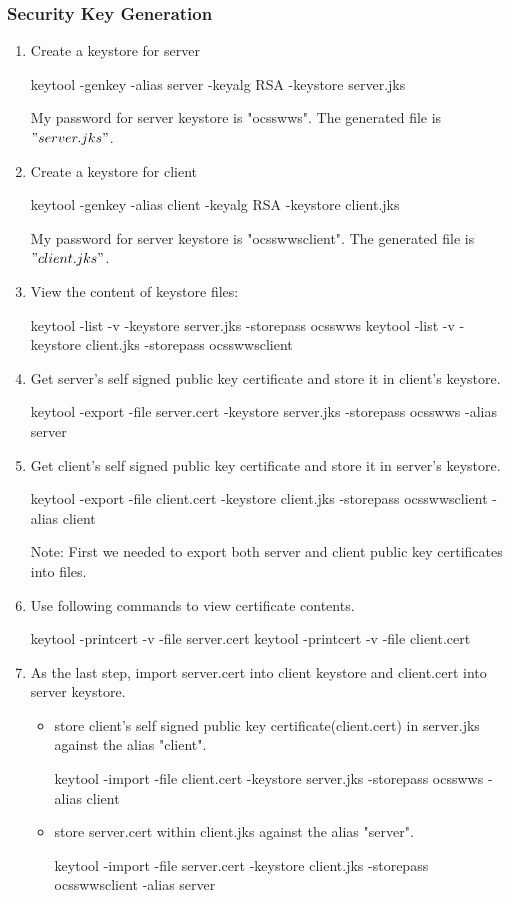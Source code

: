 \documentclass[11pt, oneside]{article}   	%
\begin{document}
\subsubsection{\color{DeepPink4}Security Key Generation}
\begin{enumerate}
\item  Create a keystore for server
\begin{code}
keytool -genkey -alias server -keyalg RSA -keystore server.jks
\end{code}
My password for server keystore is "ocsswws". The generated file is $"server.jks"$.
\item  Create a keystore for client
\begin{code}
keytool -genkey -alias client -keyalg RSA -keystore client.jks
\end{code}
My password for server keystore is "ocsswwsclient". The generated file is $"client.jks"$.

\item
View the content of keystore files:
\begin{code}
keytool -list -v -keystore server.jks -storepass ocsswws
keytool -list -v -keystore client.jks -storepass ocsswwsclient
\end{code}
\item Get server's self signed public key certificate and store it in client's keystore.
\begin{code}
keytool -export -file server.cert -keystore server.jks -storepass ocsswws -alias server
\end{code}
\item Get client's self signed public key certificate and store it in server's keystore.
\begin{code}
keytool -export -file client.cert -keystore client.jks -storepass ocsswwsclient -alias client
\end{code}

{\color{red}Note: First we needed to export both server and client public key certificates into files.}
\item Use following commands to view certificate contents.
\begin{code}
keytool -printcert -v -file server.cert
keytool -printcert -v -file client.cert
\end{code}
\item As the last step, import server.cert into client keystore and client.cert into server keystore.
\begin{itemize}
\item store client's self signed public key certificate(client.cert) in server.jks against the alias "client".
\begin{code}
keytool -import -file client.cert -keystore server.jks -storepass ocsswws -alias client
\end{code}
\item store server.cert within client.jks against the alias "server".
\begin{code}
keytool -import -file server.cert -keystore client.jks -storepass ocsswwsclient -alias server
\end{code}
\end{itemize}


\end{enumerate}
\end{document}
